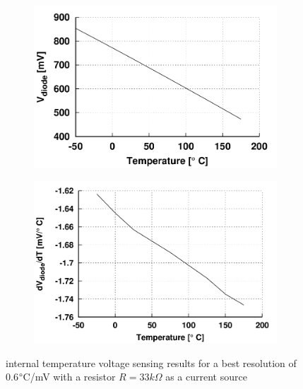 \begin{figure}[htp]
    \centering
    \begin{subfigure}[b]{0.48\textwidth}
        \centering
        \includegraphics[width=\textwidth]{Chapter5/Figs/vdiode.png}
        \label{fig:vdiode}
    \end{subfigure}
    \begin{subfigure}[b]{0.48\textwidth}
        \centering
        \includegraphics[width=\textwidth]{Chapter5/Figs/vdiode_dt.png}
        \label{fig:diode_sens_temp}
    \end{subfigure}
    \caption{internal temperature voltage sensing results for a best resolution of 0.6\(\degree\)C/mV with a resistor $R = 33 k\Omega$ as a current source}
    \label{fig:vdiode_sim}
\end{figure}

